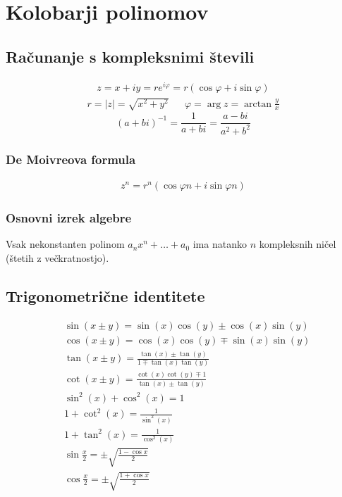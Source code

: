 \section*{Kolobarji polinomov}
\subsection*{Računanje s kompleksnimi števili}
\begin{gather*}
	z = x + iy = r e^{i\varphi} = r\left( \cos \varphi + i \sin \varphi \right)
\end{gather*}
\begin{align*}
	r = |z| = \sqrt{x^2 + y^2} && \varphi = \arg z = \arctan \frac{y}{x}
\end{align*}
\[ (a+bi)^{-1} = \frac{1}{a+bi} = \frac{a-bi}{a^2+b^2}\]

\subsubsection*{De Moivreova formula}
\begin{align*}
	z^n = r^n\left( \cos \varphi n + i \sin \varphi n \right)
\end{align*}

\subsubsection*{Osnovni izrek algebre}
Vsak nekonstanten polinom $a_n x^n + \dots + a_0$ ima natanko $n$ kompleksnih ničel (štetih z večkratnostjo).

\subsection*{Trigonometrične identitete}
\begin{align*}
	&\sin(x \pm y) = \sin(x) \cos(y) \pm \cos(x) \sin(y) \\
	&\cos(x \pm y) = \cos(x) \cos(y) \mp \sin(x) \sin(y)\\
	&\tan(x \pm y) = \frac{\tan(x)\pm \tan(y)}{1 \mp \tan(x) \tan(y)}\\
	&\cot(x \pm y) = \frac{\cot(x)\cot(y) \mp 1}{\tan(x) \pm \tan(y)}\\
	&\sin^2(x)+\cos^2(x) = 1\\
	&1+\cot^2(x) = \frac{1}{\sin^2(x)}\\
	&1+\tan^2(x) = \frac{1}{\cos^2(x)}\\
	&\sin\frac{x}{2} = \pm\sqrt{\frac{1-\cos x}{2}}\\
	&\cos\frac{x}{2} = \pm\sqrt{\frac{1+\cos x}{2}}\\
\end{align*}

